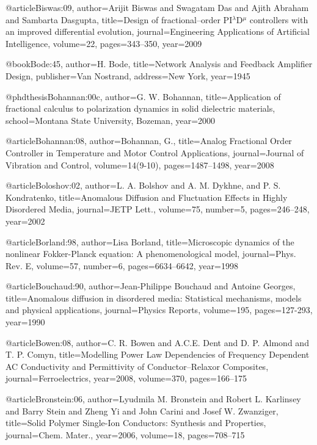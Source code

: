 \begin{thebibliography}{99}
@article{Biswas:09,
  author={Arijit Biswas and Swagatam Das and Ajith Abraham and Sambarta Dasgupta},
  title={Design of fractional--order {PI}$^\lambda$D$^\mu$ controllers with an
    improved differential evolution},
  journal={Engineering Applications of Artificial Intelligence},
  volume={22},
  pages={343--350},
  year={2009}
}

@book{Bode:45,
  author={H. Bode},
  title={Network Analysis and Feedback Amplifier Design},
  publisher={Van Nostrand},
  address={New York},
  year={1945}
}

@phdthesis{Bohannan:00c,
  author={G. W. Bohannan},
  title={Application of fractional calculus to polarization dynamics in solid dielectric
    materials},
  school={Montana State University, Bozeman},
  year={2000}
}

@article{Bohannan:08,
  author={Bohannan, G.},
  title={Analog Fractional Order Controller in Temperature and Motor Control Applications},
  journal={Journal of Vibration and Control},
  volume={14(9-10)},
  pages={1487--1498},
  year={2008}
}

@article{Boloshov:02,
  author={L. A. Bolshov and A. M. Dykhne, and P. S. Kondratenko},
  title={Anomalous Diffusion and Fluctuation Effects in Highly Disordered Media},
  journal={JETP Lett.},
  volume={75},
  number={5},
  pages={246--248},
  year={2002}
}

@article{Borland:98,
  author={Lisa Borland},
  title={Microscopic dynamics of the nonlinear Fokker-Planck equation: {A} phenomenological
    model},
  journal={Phys. Rev. E},
  volume={57},
  number={6},
  pages={6634--6642},
  year={1998}
}

@article{Bouchaud:90,
  author={Jean-Philippe Bouchaud and Antoine Georges},
  title={Anomalous diffusion in disordered media: Statistical mechanisms, models
    and physical applications},
  journal={Physics Reports},
  volume={195},
  pages={127-293},
  year={1990}
}

@article{Bowen:08,
  author={C. R. Bowen and A.C.E. Dent and D. P. Almond and T. P. Comyn},
  title={Modelling Power Law Dependencies of Frequency Dependent {AC} Conductivity
    and Permittivity of Conductor--Relaxor Composites},
  journal={Ferroelectrics},
  year={2008},
  volume={370},
  pages={166--175}
}

@article{Bronstein:06,
  author={Lyudmila M. Bronstein and Robert L. Karlinsey and Barry Stein and Zheng
    Yi and John Carini and Josef W. Zwanziger},
  title={Solid Polymer Single-Ion Conductors: Synthesis and Properties},
  journal={Chem. Mater.},
  year={2006},
  volume={18},
  pages={708--715}
}


\end{thebibliography}
